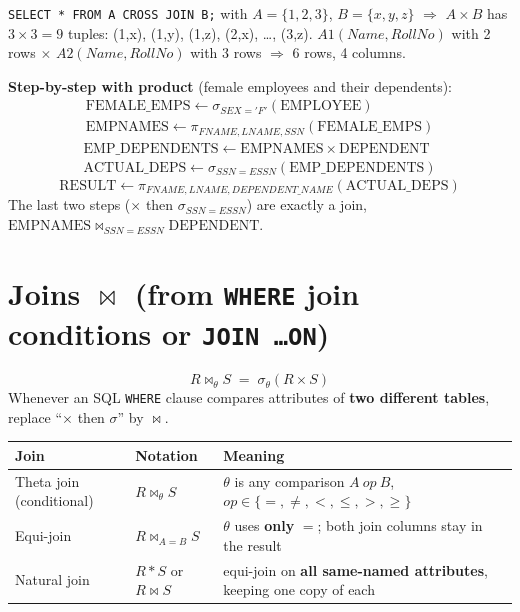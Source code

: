 \documentclass[10pt,a4paper]{article}
\newcommand{\R}[1]{\mathrm{#1}}          %
\begin{document}
\begin{exbox}
\texttt{SELECT * FROM A CROSS JOIN B;} with $A = \{1,2,3\}$, $B = \{x,y,z\}$ $\Rightarrow$ $A \times B$ has $3 \times 3 = 9$ tuples: (1,x), (1,y), (1,z), (2,x), \dots, (3,z).
$A1(Name, RollNo)$ with 2 rows $\times$ $A2(Name, RollNo)$ with 3 rows $\Rightarrow$ 6 rows, 4 columns.

\textbf{Step-by-step with product} (female employees and their dependents):
\begin{gather*}
\R{FEMALE\_EMPS} \leftarrow \sigma_{SEX='F'}(\R{EMPLOYEE}) \\
\R{EMPNAMES} \leftarrow \pi_{FNAME,LNAME,SSN}(\R{FEMALE\_EMPS})
\end{gather*}
\begin{gather*}
\R{EMP\_DEPENDENTS} \leftarrow \R{EMPNAMES} \times \R{DEPENDENT} \\
\R{ACTUAL\_DEPS} \leftarrow \sigma_{SSN=ESSN}(\R{EMP\_DEPENDENTS})
\end{gather*}
\[ \R{RESULT} \leftarrow \pi_{FNAME,LNAME,DEPENDENT\_NAME}(\R{ACTUAL\_DEPS}) \]
The last two steps ($\times$ then $\sigma_{SSN=ESSN}$) are exactly a join, $\R{EMPNAMES} \bowtie_{SSN=ESSN} \R{DEPENDENT}$.
\end{exbox}

\section{Joins $\bowtie$ (from \texttt{WHERE} join conditions or \texttt{JOIN \dots ON})}

\begin{keybox}[Join = product + selection]
\[ R \bowtie_{\theta} S \;=\; \sigma_{\theta}(R \times S) \]
Whenever an SQL \texttt{WHERE} clause compares attributes of \textbf{two different tables}, replace ``$\times$ then $\sigma$'' by $\bowtie$.
\end{keybox}

\begin{tabularx}{\linewidth}{@{}l l X@{}}
\toprule
\textbf{Join} & \textbf{Notation} & \textbf{Meaning}\\\midrule
Theta join (conditional) & $R \bowtie_{\theta} S$ & $\theta$ is any comparison $A\ op\ B$, $op \in \{=,\neq,<,\le,>,\ge\}$\\
Equi-join & $R \bowtie_{A=B} S$ & $\theta$ uses \textbf{only} $=$; both join columns stay in the result\\
Natural join & $R * S$ or $R \bowtie S$ & equi-join on \textbf{all same-named attributes}, keeping one copy of each\\
\bottomrule
\end{tabularx}
\end{document}
